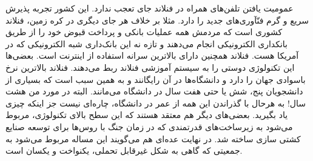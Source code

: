 عمومیت یافتن تلفن‌های همراه در فنلاند جای تعجب ندارد. این کشور تجربه
پذیرش سریع و گرم فنّآوری‌های جدید را دارد. مثلا بر خلاف هر جای دیگری در
کره زمین، فنلاند کشوری است که مردمش همه عملیات بانکی و پرداخت قبوض خود
را از طریق بانکداری الکترونیکی انجام می‌دهند و تازه نه این بانک‌داری شبه
الکترونیکی که در آمریکا هست. فنلاند همچنین دارای بالاترین سرانه
استفاده از اینترنت است. بعضی‌ها این تکنولوژی دوستی را به سیستم آموزشی
فنلاند ربط می‌دهند. فنلاند بالاترین نرخ باسوادی جهان را دارد و
دانشگاه‌ها در آن رایگانند و به همین سبب است که بسیاری از دانشجویان پنج،
شش یا حتی هفت سال در دانشگاه می‌مانند. البته در مورد من هشت سال! به
هرحال با گذراندن این همه از عمر در دانشگاه، چاره‌ای نیست جز اینکه چیزی
یاد بگیرید. بعضی‌های دیگر هم معتقد هستند که این سطح بالای تکنولوژی،
مربوط می‌شود به زیرساخت‌های قدرتمندی که در زمان جنگ با روس‌ها برای توسعه
صنایع کشتی‌ سازی ساخته شد. در نهایت عده‌ای هم می‌گویند این مساله مربوط
می‌شود به جمعیتی که گاهی به شکل غیرقابل تحملی، یکنواخت و یکسان است.

